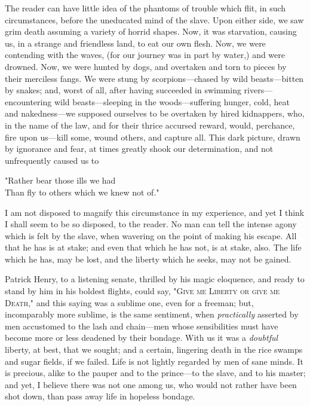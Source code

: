 The reader can have little idea of the phantoms of trouble which flit,
in such circumstances, before the uneducated mind of the slave. Upon
either side, we saw grim death assuming a variety of horrid shapes. Now,
it was starvation, causing us, in a strange and friendless land, to eat
our own flesh. Now, we were contending with the waves, (for our journey
was in part by water,) and were drowned. Now, we were hunted by dogs,
and overtaken and torn to pieces by their merciless fangs. We were stung
by scorpions---chased by wild beasts---bitten by snakes; and, worst of
all, after having succeeded in swimming rivers---encountering wild
beasts---sleeping in the woods---suffering hunger, cold, heat and
nakedness---we supposed ourselves to be overtaken by hired kidnappers,
who, in the name of the law, and for their thrice accursed reward,
would, perchance, fire upon us---kill some, wound others, and capture
all. This dark picture, drawn by ignorance and fear, at times greatly
shook our determination, and not unfrequently caused us to

{"}Rather bear those ills we had\\
Than fly to others which we knew not of."

I am not disposed to magnify this circumstance in my experience, and yet
I think I shall seem to be so {\protect\hypertarget{284}{}{}}disposed,
to the reader. No man can tell the intense agony which is felt by the
slave, when wavering on the point of making his escape. All that he has
is at stake; and even that which he has not, is at stake, also. The life
which he has, may be lost, and the liberty which he seeks, may not be
gained.

Patrick Henry, to a listening senate, thrilled by his magic eloquence,
and ready to stand by him in his boldest flights, could say,
"\textsc{Give me Liberty or give me Death}," and this saying was a
sublime one, even for a freeman; but, incomparably more sublime, is the
same sentiment, when \emph{practically} asserted by men accustomed to
the lash and chain---men whose sensibilities must have become more or
less deadened by their bondage. With us it was a \emph{doubtful}
liberty, at best, that we sought; and a certain, lingering death in the
rice swamps and sugar fields, if we failed. Life is not lightly regarded
by men of sane minds. It is precious, alike to the pauper and to the
prince---to the slave, and to his master; and yet, I believe there was
not one among us, who would not rather have been shot down, than pass
away life in hopeless bondage.

